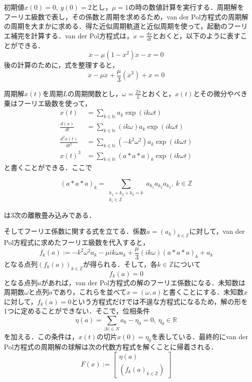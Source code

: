 \documentclass[11pt,a4paper,titlepage]{jsreport}
\theoremstyle{definition}
\begin{document}
初期値$x(0)=0,\ y(0)=2$とし，$\mu=1$の時の数値計算を実行する．周期解をフーリエ級数で表し，その係数と周期を求めるため，van der Pol方程式の周期解の周期を大まかに求める．得た近似周期軌道と近似周期を使って，起動のフーリエ補完を計算する．van der Pol方程式は，$\dot{x}=\frac{dx}{dt}$とおくと，以下のように表すことができる．
\begin{equation*}
  \ddot{x} - \mu (1-x^2)\dot{x} - x = 0
\end{equation*}
後の計算のために，式を整理すると，
\begin{equation*}
  \ddot{x} - \mu \dot{x} + \frac{\mu}{3} \left(\dot{x}^3\right) + x = 0
\end{equation*}

周期解$x(t)$を周期$L$の周期関数とし，$\omega = \frac{2\pi}{L}$とおくと，$x(t)$とその微分やべき乗はフーリエ級数を使って，
\begin{align*}
  x(t)                 & = \sum_{k\in\mathbb{N}} a_k \exp(ik \omega t)                \\
  \frac{d(x)}{dt}      & = \sum_{k\in\mathbb{N}} (ik \omega) a_k \exp(ik \omega t)    \\
  \frac{d^2x(t)}{dt^2} & = \sum_{k\in\mathbb{N}} (-k^2\omega^2) a_k \exp(ik \omega t) \\
  x(t)^3               & = \sum_{k\in\mathbb{N}} (a*a*a)_k \exp(ik \omega t)
\end{align*}
と書くことができる．ここで

\begin{equation*}
  (a*a*a)_k = \sum_{\substack{k_1+k_2+k_3=k\\k_i\in\mathbb{Z}}} a_{k_1}a_{k_2}a_{k_3},\ k\in\mathbb{Z}
\end{equation*}

は3次の離散畳み込みである．

そしてフーリエ係数に関する式を立てる．係数$a=\left(a_k\right)_{k\in\mathbb{Z}}$に対して，van der Pol方程式に求めたフーリエ級数を代入すると，
\begin{equation*}
  f_k(a) := -k^2\omega^2 a_k - \mu ik \omega a_k + \frac{\mu}{3} (ik \omega)(a*a*a)_k + a_k
\end{equation*}
となる点列$(f_k(a))_{k\in\mathbb{Z}}$が得られる．そして，各$k\in\mathbb{Z}$について
\begin{equation*}
  f_k(a) = 0
\end{equation*}
となる点列$a$があれば，van der Pol方程式の解のフーリエ係数になる．未知数は周期数$\omega$と点列$a$であり，これらを並べて$x=(\omega,a)$と書くことにする．未知数$x$に対して，$f_k(a)=0$という方程式だけでは不逞な方程式になるため，解の形を1つに定めることができない．そこで，位相条件
\begin{equation*}
  \eta(a) = \sum_{|k|\in N} a_k-\eta_0 = 0,\ \eta_0\in\mathbb{R}
\end{equation*}
を加える．この条件は，$x(t)$の切片$x(0)=\eta_0$を表している．最終的にvan der Pol方程式の周期解の球解は次の代数方程式を解くことに帰着される．
\begin{equation*}
  F(x) := \begin{bmatrix}
    \eta(a) \\
    \left(f_k(a)_{k\in\mathbb{Z}}\right)
  \end{bmatrix}
\end{equation*}
\end{document}
